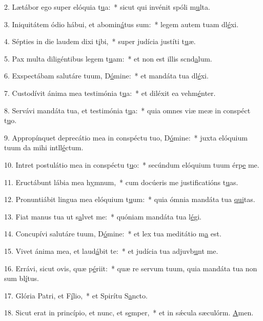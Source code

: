 2. Lætábor ego super elóquia t\uline{u}a:~* sicut qui invénit spóli m\uline{u}lta.\par 
3. Iniquitátem ódio hábui, et abomin\uline{á}tus sum:~* legem autem tuam dl\uline{é}xi.\par 
4. Sépties in die laudem dixi t\uline{i}bi,~* super judícia justíti t\uline{u}æ.\par 
5. Pax multa diligéntibus legem t\uline{u}am:~* et non est illis scnd\uline{a}lum.\par 
6. Exspectábam salutáre tuum, D\uline{ó}mine:~* et mandáta tua dl\uline{é}xi.\par 
7. Custodívit ánima mea testimónia t\uline{u}a:~* et diléxit ea vehm\uline{é}nter.\par 
8. Servávi mandáta tua, et testimónia t\uline{u}a:~* quia omnes viæ meæ in conspéct t\uline{u}o.\par 
9. Appropínquet deprecátio mea in conspéctu tuo, D\uline{ó}mine:~* juxta elóquium tuum da mihi intll\uline{é}ctum.\par 
10. Intret postulátio mea in conspéctu t\uline{u}o:~* secúndum elóquium tuum érp\uline{e} me.\par 
11. Eructábunt lábia mea h\uline{y}mnum,~* cum docúeris me justificatións t\uline{u}as.\par 
12. Pronuntiábit lingua mea elóquium t\uline{u}um:~* quia ómnia mandáta tua \uline{qui}tas.\par 
13. Fiat manus tua ut s\uline{a}lvet me:~* quóniam mandáta tua l\uline{é}gi.\par 
14. Concupívi salutáre tuum, D\uline{ó}mine:~* et lex tua meditátio m\uline{a} est.\par 
15. Vivet ánima mea, et laud\uline{á}bit te:~* et judícia tua adjuvb\uline{u}nt me.\par 
16. Errávi, sicut ovis, quæ p\uline{é}riit:~* quæ re servum tuum, quia mandáta tua non sum bl\uline{í}tus.\par 
17. Glória Patri, et F\uline{í}lio,~* et Spirítu S\uline{a}ncto.\par 
18. Sicut erat in princípio, et nunc, et s\uline{e}mper,~* et in sǽcula sæculórm. \uline{A}men.\par 
